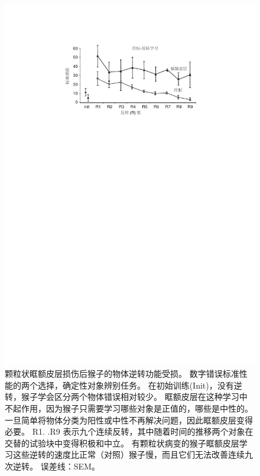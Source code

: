 \begin{figure}[!htb]
	\centering
	\includegraphics{chap4/fig_4_7}
	\caption{颗粒状眶额皮层损伤后猴子的物体逆转功能受损。
		数字错误标准性能的两个选择，确定性对象辨别任务。
		在初始训练(Init)，没有逆转，猴子学会区分两个物体错误相对较少。
		眶额皮层在这种学习中不起作用，因为猴子只需要学习哪些对象是正值的，哪些是中性的。
		一旦简单将物体分类为阳性或中性不再解决问题，因此眶额皮层变得必要。
		R1. .R9 表示九个连续反转，其中随着时间的推移两个对象在交替的试验块中变得积极和中立。
		有颗粒状病变的猴子眶额皮层学习这些逆转的速度比正常（对照）猴子慢，而且它们无法改善连续九次逆转。
		误差线：SEM\cite{izquierdo2004bilateral}。}
	\label{fig:fig_4_7}
\end{figure}


